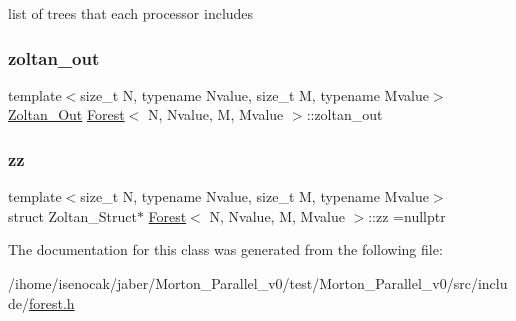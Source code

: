 list of trees that each processor includes \mbox{\label{classForest_ade305be3714d6cb24b7e8f8950f7cd94}} 
\subsubsection{\texorpdfstring{zoltan\+\_\+out}{zoltan\_out}}
{\footnotesize\ttfamily template$<$size\+\_\+t N, typename Nvalue, size\+\_\+t M, typename Mvalue$>$ \\
\mbox{\hyperlink{structZoltan__Out}{Zoltan\+\_\+\+Out}} \mbox{\hyperlink{classForest}{Forest}}$<$ N, Nvalue, M, Mvalue $>$\+::zoltan\+\_\+out\hspace{0.3cm}{\ttfamily [private]}}

\mbox{\label{classForest_a44a511be69173780d2804d373df3a3f1}} 
\subsubsection{\texorpdfstring{zz}{zz}}
{\footnotesize\ttfamily template$<$size\+\_\+t N, typename Nvalue, size\+\_\+t M, typename Mvalue$>$ \\
struct Zoltan\+\_\+\+Struct$\ast$ \mbox{\hyperlink{classForest}{Forest}}$<$ N, Nvalue, M, Mvalue $>$\+::zz =nullptr\hspace{0.3cm}{\ttfamily [private]}}



The documentation for this class was generated from the following file\+:\begin{DoxyCompactItemize}
\item 
/ihome/isenocak/jaber/\+Morton\+\_\+\+Parallel\+\_\+v0/test/\+Morton\+\_\+\+Parallel\+\_\+v0/src/include/\mbox{\hyperlink{forest_8h}{forest.\+h}}\end{DoxyCompactItemize}
